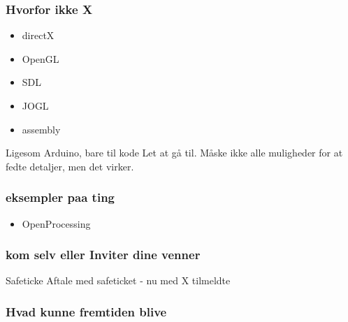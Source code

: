 \documentclass{beamer}
\begin{document}
 \begin{frame}
   \frametitle{Hvorfor ikke X}
   
   \begin{itemize}
   \item directX
   \item OpenGL
   \item SDL
   \item JOGL
   \item assembly
   \end{itemize}
   
   \begin{block}{Ligesom Arduino, bare til kode}
     Let at gå til. Måske ikke alle muligheder for at fedte detaljer, men det virker.
   \end{block}
   

   \end{frame}
   
   \begin{frame}
     \frametitle{eksempler paa ting}
     \begin{itemize}
     \item OpenProcessing
     \end{itemize}

   \end{frame}
   
   \begin{frame}
     \frametitle{kom selv eller Inviter dine venner}

     \begin{block}{Safeticke}
       Aftale med safeticket - nu med X tilmeldte
     \end{block}
     
   \end{frame}
   
   \begin{frame}
     \frametitle{Hvad kunne fremtiden blive}

   \end{frame}
   
\end{document}

